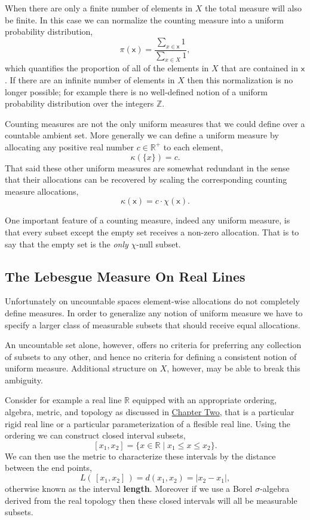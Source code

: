 \documentclass[
  letterpaper,
  DIV=11,
  numbers=noendperiod]{scrartcl}
\begin{document}
When there are only a finite number of elements in \(X\) the total
measure will also be finite. In this case we can normalize the counting
measure into a uniform probability distribution, \[
\pi ( \mathsf{x} ) =
\frac{ \sum_{x \in \mathsf{x}} 1 }{ \sum_{x \in X} 1 },
\] which quantifies the proportion of all of the elements in \(X\) that
are contained in \(\mathsf{x}\). If there are an infinite number of
elements in \(X\) then this normalization is no longer possible; for
example there is no well-defined notion of a uniform probability
distribution over the integers \(\mathbb{Z}\).

Counting measures are not the only uniform measures that we could define
over a countable ambient set. More generally we can define a uniform
measure by allocating any positive real number \(c \in \mathbb{R}^{+}\)
to each element, \[
\kappa(\{ x \}) = c.
\] That said these other uniform measures are somewhat redundant in the
sense that their allocations can be recovered by scaling the
corresponding counting measure allocations, \[
\kappa ( \mathsf{x} ) = c \cdot \chi ( \mathsf{x} ).
\]

One important feature of a counting measure, indeed any uniform measure,
is that every subset except the empty set receives a non-zero
allocation. That is to say that the empty set is the \emph{only}
\(\chi\)-null subset.

\hypertarget{sec:lebesgue}{%
\subsection{The Lebesgue Measure On Real Lines}\label{sec:lebesgue}}

Unfortunately on uncountable spaces element-wise allocations do not
completely define measures. In order to generalize any notion of uniform
measure we have to specify a larger class of measurable subsets that
should receive equal allocations.

An uncountable set alone, however, offers no criteria for preferring any
collection of subsets to any other, and hence no criteria for defining a
consistent notion of uniform measure. Additional structure on \(X\),
however, may be able to break this ambiguity.

Consider for example a real line \(\mathbb{R}\) equipped with an
appropriate ordering, algebra, metric, and topology as discussed in
\href{https://betanalpha.github.io/assets/chapters_html/spaces.html}{Chapter
Two}, that is a particular rigid real line or a particular
parameterization of a flesible real line. Using the ordering we can
construct closed interval subsets, \[
[ x_{1}, x_{2} ] = \{ x \in \mathbb{R} \mid x_{1} \le x \le x_{2} \}.
\] We can then use the metric to characterize these intervals by the
distance between the end points, \[
L( \, [ x_{1}, x_{2} ] \, ) = d( x_{1}, x_{2} ) = | x_{2} - x_{1} |,
\] otherwise known as the interval \textbf{length}. Moreover if we use a
Borel \(\sigma\)-algebra derived from the real topology then these
closed intervals will all be measurable subsets.
\end{document}
